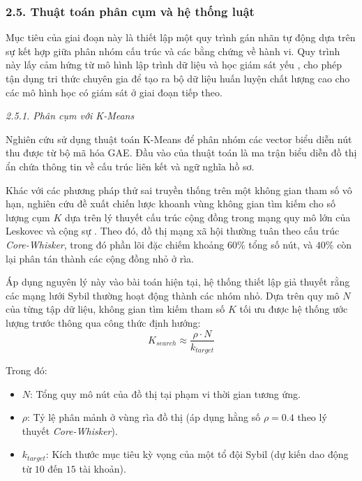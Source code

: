 \subsubsection{2.5. Thuật toán phân cụm và hệ thống luật}

\indent\indent Mục tiêu của giai đoạn này là thiết lập một quy trình gán nhãn tự động dựa trên sự kết hợp giữa phân nhóm cấu trúc và các bằng chứng về hành vi. Quy trình này lấy cảm hứng từ mô hình lập trình dữ liệu và học giám sát yếu \cite{ratner2017snorkel}, cho phép tận dụng tri thức chuyên gia để tạo ra bộ dữ liệu huấn luyện chất lượng cao cho các mô hình học có giám sát ở giai đoạn tiếp theo.\vspace{0.3cm}

\textit{2.5.1. Phân cụm với K-Means}\vspace{0.2cm}

Nghiên cứu sử dụng thuật toán K-Means \cite{macqueen1967some} để phân nhóm các vector biểu diễn nút thu được từ bộ mã hóa GAE. Đầu vào của thuật toán là ma trận biểu diễn đồ thị ẩn chứa thông tin về cấu trúc liên kết và ngữ nghĩa hồ sơ.\vspace{0.3cm}

Khác với các phương pháp thử sai truyền thống trên một không gian tham số vô hạn, nghiên cứu đề xuất chiến lược khoanh vùng không gian tìm kiếm cho số lượng cụm $K$ dựa trên lý thuyết cấu trúc cộng đồng trong mạng quy mô lớn của Leskovec và cộng sự \cite{leskovec2009community}. Theo đó, đồ thị mạng xã hội thường tuân theo cấu trúc \textit{Core-Whisker}, trong đó phần lõi đặc chiếm khoảng $60\%$ tổng số nút, và $40\%$ còn lại phân tán thành các cộng đồng nhỏ ở rìa.\vspace{0.3cm}

Áp dụng nguyên lý này vào bài toán hiện tại, hệ thống thiết lập giả thuyết rằng các mạng lưới Sybil thường hoạt động thành các nhóm nhỏ. Dựa trên quy mô $N$ của từng tập dữ liệu, không gian tìm kiếm tham số $K$ tối ưu được hệ thống ước lượng trước thông qua công thức định hướng:
\[
    K_{search} \approx \frac{\rho \cdot N}{k_{target}}
\]

Trong đó:
\begin{itemize}[label={--}, itemsep=1pt]
    \item $N$: Tổng quy mô nút của đồ thị tại phạm vi thời gian tương ứng.
    \item $\rho$: Tỷ lệ phân mảnh ở vùng rìa đồ thị (áp dụng hằng số $\rho = 0.4$ theo lý thuyết \textit{Core-Whisker}).
    \item $k_{target}$: Kích thước mục tiêu kỳ vọng của một tổ đội Sybil (dự kiến dao động từ $10$ đến $15$ tài khoản).
\end{itemize}

